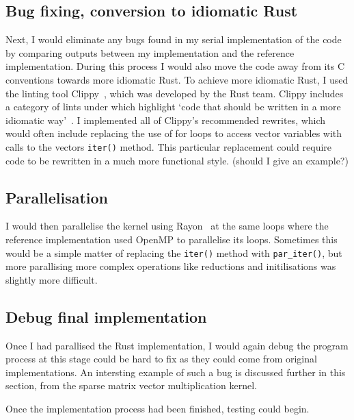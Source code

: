 \subsection{Bug fixing, conversion to idiomatic Rust}
Next, I would eliminate any bugs found in my serial implementation of the code by comparing outputs between my implementation and the reference implementation. During this process I would also move the code away from its C conventions towards more idiomatic Rust. To achieve more idiomatic Rust, I used the linting tool Clippy~\cite{RustClippy}, which was developed by the Rust team.  Clippy includes a category of lints under  which highlight `code that should be written in a more idiomatic way'~\cite{RustClippy}. I implemented all of Clippy's recommended rewrites, which would often include replacing the use of for loops to access vector variables with calls to the vectors \texttt{iter()} method. This particular replacement could require code to be rewritten in a much more functional style. (should I give an example?)

\subsection{Parallelisation}
I would then parallelise the kernel using Rayon~\cite{RustRayon} at the same loops where the reference implementation used OpenMP to parallelise its loops. Sometimes this would be a simple matter of replacing the \texttt{iter()} method with \texttt{par\_iter()}, but more parallising more complex operations like reductions and initilisations was slightly more difficult.

\subsection{Debug final implementation}
Once I had parallised the Rust implementation, I would again debug the program process at this stage could be hard to fix as they could come from original implementations. An intersting example of such a bug is discussed further in this section, from the sparse matrix vector multiplication kernel.

Once the implementation process had been finished, testing could begin.

